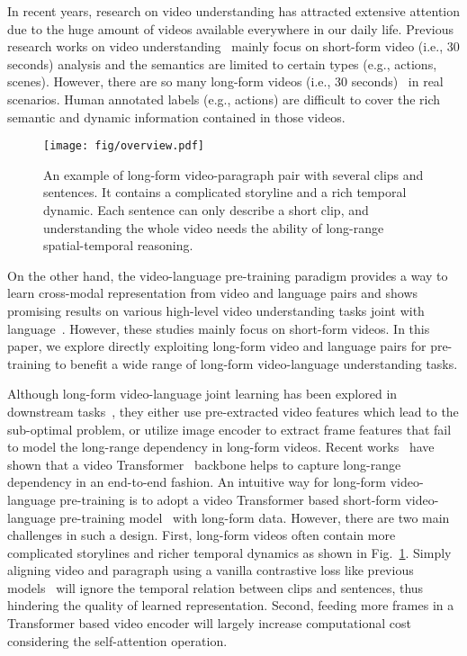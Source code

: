 \documentclass{article}
\begin{document}
In recent years, research on video understanding has attracted extensive attention due to the huge amount of videos available everywhere in our daily life. 
Previous research works on video understanding~\cite{feichtenhofer2019slowfast,feichtenhofer2016two-stream-fusion,simonyan2014two-stream,tran2015c3d,zhao2017tsn} mainly focus on short-form video (i.e.,  30 seconds) analysis and the semantics are limited to certain types (e.g., actions, scenes).
However, there are so many long-form videos (i.e.,  30 seconds)~\cite{wu2021towards-longform} in real scenarios. Human annotated labels (e.g., actions) are difficult to cover the rich semantic and dynamic information contained in those videos.
\begin{figure}
    \centering
    \texttt{[image: fig/overview.pdf]}
    \caption{An example of long-form video-paragraph pair with several clips and sentences. It contains a complicated storyline and a rich temporal dynamic. Each sentence can only describe a short clip, and understanding the whole video needs the ability of long-range spatial-temporal reasoning.\vspace{-5mm}}
    \label{fig:overview}
    \vspace{-5mm}
\end{figure}
On the other hand, the video-language pre-training paradigm provides a way to learn cross-modal representation from video and language pairs and shows promising results on various high-level video understanding tasks joint with language~\cite{bain2021frozen,li2020hero, xue2021hdvila,zellers2021merlot}. However, these studies mainly focus on short-form videos. In this paper, we explore directly exploiting long-form video and language pairs for pre-training to benefit a wide range of long-form video-language understanding tasks.

Although long-form video-language joint learning has been explored in downstream tasks~\cite{ging2020coot,li2020hero,li2021value,liu2020violin,yu2019activitynetqa,zhang2018hse,zhuang2020multichannel-vqa}, they either use pre-extracted video features which lead to the sub-optimal problem, or utilize image encoder to extract frame features that fail to model the long-range dependency in long-form videos. Recent works~\cite{bain2021frozen,bertasius2021timesformer,liu2021videoswin} have shown that a video Transformer~\cite{vaswani2017transformer} backbone helps to capture long-range dependency in an end-to-end fashion.
An intuitive way for long-form video-language pre-training is to adopt a video Transformer based short-form video-language pre-training model~\cite{bain2021frozen,xue2021hdvila} with long-form data. 
However, there are two main challenges in such a design.
First, long-form videos often contain more complicated storylines and richer temporal dynamics as shown in Fig.~\ref{fig:overview}. Simply aligning video and paragraph using a vanilla contrastive loss like previous models~\cite{bain2021frozen,xue2021hdvila} will ignore the temporal relation between clips and sentences, thus hindering the quality of learned representation.
Second, feeding more frames in a Transformer based video encoder will largely increase computational cost considering the self-attention operation.
\end{document}
